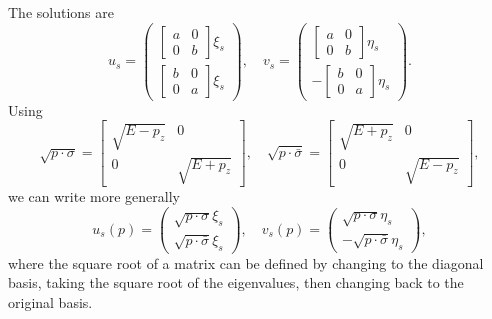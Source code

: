 The solutions are
\begin{equation}
	u_{s}=\begin{pmatrix}
	\left[\begin{array}{ll}
		a & 0 \\
		0 & b
	\end{array}\right] \xi_{s} \\
	\left[\begin{array}{ll}
		b & 0 \\
		0 & a
	\end{array}\right] \xi_{s}
	\end{pmatrix}, \quad 
	v_{s}=\begin{pmatrix}
	\left[\begin{array}{ll}
		a & 0 \\
		0 & b
	\end{array}\right] \eta_{s} \\
	-\left[\begin{array}{ll}
		b & 0 \\
		0 & a
	\end{array}\right] \eta_{s}
	\end{pmatrix}.
\end{equation}
Using
\begin{equation}
	\sqrt{p \cdot \sigma}=\left[\begin{array}{cc}
		\sqrt{E-p_{z}} & 0 \\
		0 & \sqrt{E+p_{z}}
	\end{array}\right], \quad 
	\sqrt{p \cdot \bar{\sigma}}=\left[\begin{array}{cc}
		\sqrt{E+p_{z}} & 0 \\
		0 & \sqrt{E-p_{z}}
	\end{array}\right],
\end{equation}
we can write more generally
\begin{equation}
	u_{s}(p) = \begin{pmatrix}
		\sqrt{p \cdot \sigma} \xi_{s} \\
		\sqrt{p \cdot \bar{\sigma}} \xi_{s}
	\end{pmatrix}, \quad 
	v_{s}(p) = \begin{pmatrix}
		\sqrt{p \cdot \sigma} \eta_{s} \\
		-\sqrt{p \cdot \bar{\sigma}} \eta_{s}
	\end{pmatrix},
\end{equation}
where the square root of a matrix can be defined by changing to the diagonal basis, taking the square root of the eigenvalues, then changing back to the original basis. 

